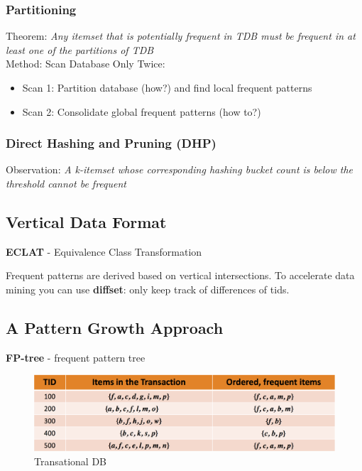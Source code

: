 \subsubsection{Partitioning}
Theorem: \textit{Any itemset that is potentially frequent in TDB must be frequent in at least one of the partitions of TDB}\\

Method: Scan Database Only Twice:
\begin{itemize}
\item Scan 1: Partition database (how?) and find local frequent patterns
\item Scan 2: Consolidate global frequent patterns (how to?)
\end{itemize}

\subsubsection{Direct Hashing and Pruning (DHP)}
Observation: \textit{A k-itemset whose corresponding hashing bucket count is below the threshold cannot be frequent}

\subsection{Vertical Data Format}\label{eclat}
\textbf{ECLAT} - Equivalence Class Transformation

Frequent patterns are derived based on vertical intersections. To accelerate data mining you can use \textbf{diffset}: only keep track of differences of tids.

\subsection{A Pattern Growth Approach}\label{fpgrowth}
\textbf{FP-tree} - frequent pattern tree

\begin{figure}[H]
    \centering
    \includegraphics[width=\linewidth]{transactional_db.png}
    \caption{Transational DB}
\end{figure}

